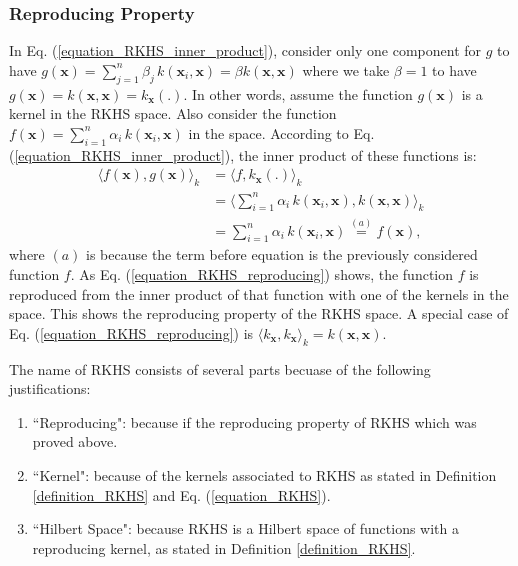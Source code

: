 \documentclass[lang=cn,10pt]{gorgeousnbook}
\numberwithin{equation}{section}%
\numberwithin{figure}{section}%
\begin{document}
\subsubsection{Reproducing Property}

In Eq. (\ref{equation_RKHS_inner_product}), consider only one component for $g$ to have $g(\boldsymbol{x}) = \sum_{j=1}^n \beta_j\, k(\boldsymbol{x}_i, \boldsymbol{x}) = \beta k(\boldsymbol{x}, \boldsymbol{x})$ where we take $\beta = 1$ to have $g(\boldsymbol{x}) = k(\boldsymbol{x}, \boldsymbol{x}) = k_{\boldsymbol{x}}(.)$. 
In other words, assume the function $g(\boldsymbol{x})$ is a kernel in the RKHS space. 
Also consider the function $f(\boldsymbol{x}) = \sum_{i=1}^n \alpha_i\, k(\boldsymbol{x}_i, \boldsymbol{x})$ in the space. According to  Eq. (\ref{equation_RKHS_inner_product}), the inner product of these functions is:
\begin{align}
\langle f(\boldsymbol{x}), g(\boldsymbol{x}) \rangle_k &= \langle f, k_{\boldsymbol{x}}(.) \rangle_k \nonumber \\
&= \Big\langle \sum_{i=1}^n \alpha_i\, k(\boldsymbol{x}_i, \boldsymbol{x}), k(\boldsymbol{x}, \boldsymbol{x}) \Big\rangle_k \nonumber \\
&= \sum_{i=1}^n \alpha_i\, k(\boldsymbol{x}_i, \boldsymbol{x}) \overset{(a)}{=} f(\boldsymbol{x}), \label{equation_RKHS_reproducing}
\end{align}
where $(a)$ is because the term before equation is the previously considered function $f$. 
As Eq. (\ref{equation_RKHS_reproducing}) shows, the function $f$ is reproduced from the inner product of that function with one of the kernels in the space. This shows the reproducing property of the RKHS space. 
A special case of Eq. (\ref{equation_RKHS_reproducing}) is $\langle k_{\boldsymbol{x}}, k_{\boldsymbol{x}} \rangle_k = k(\boldsymbol{x}, \boldsymbol{x})$. 

The name of RKHS consists of several parts becuase of the following justifications:
\begin{enumerate}
\item ``Reproducing": because if the reproducing property of RKHS which was proved above. 
\item ``Kernel": because of the kernels associated to RKHS as stated in Definition \ref{definition_RKHS} and Eq. (\ref{equation_RKHS}). 
\item ``Hilbert Space": because RKHS is a Hilbert space of functions with a reproducing kernel, as stated in Definition \ref{definition_RKHS}.
\end{enumerate}
\end{document}
